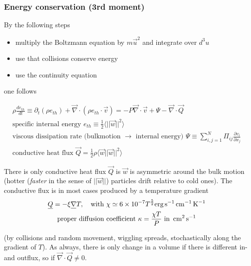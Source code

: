 \subsubsection{Energy conservation (3rd moment)}
By the following steps
\begin{itemize}
    \item multiply the Boltzmann equation by $m\vec{u}^2$ and integrate over $d^3u$
    \item use that collisions conserve energy
    \item use the continuity equation
\end{itemize}
one follows
\begin{mdframed}[style = padded]
    \begin{equation}
        \begin{gathered}
            \rho \frac{de_{th}}{dt} \equiv \partial_t (\rho e_{th}) + \vec{\nabla} \cdot (\rho e_{th}\cdot \vec{v}) = -P \vec{\nabla}\cdot \vec{v} + \Psi - \vec{\nabla} \cdot \vec{Q} \\
            \text{specific internal energy } e_{th} \equiv \frac{1}{2} \langle ||\vec{w}||^2 \rangle \\
            \text{viscous dissipation rate (bulkmotion } \rightarrow \text{ internal energy) } \Psi \equiv \sum_{i,j=1}^{N} \Pi_{ij} \frac{\partial v_i}{\partial x_j} \\
            \text{conductive heat flux } \vec{Q} = \frac{1}{2} \rho \langle \vec{w} ||\vec{w}||^2 \rangle
        \end{gathered}
    \end{equation}
\end{mdframed}
There is only conductive heat flux $\vec{Q}$ is $\vec{w}$ is asymmetric around the bulk motion (hotter (\textit{faster} in the sense of $||\vec{w}||$) particles drift relative to cold ones).
The conductive flux is in most cases produced by a temperature gradient
\begin{equation}
    \begin{gathered}
        \vec{Q} = -\xi \vec{\nabla} T, \quad \text{with } \chi \simeq 6 \times 10^{-7} T^{\frac{5}{2}} \text{erg} \s^{-1} \cm^{-1} \K^{-1} \\
        \text{proper diffusion coefficient } \kappa = \frac{\chi T}{P} \text{ in } \cm^2 \s^{-1}
    \end{gathered}
\end{equation}

(by collisions and random movement, wiggling spreads, stochastically along the gradient of $T$). As always, there is only change in a volume
if there is different in- and outflux, so if $\vec{\nabla} \cdot \vec{Q} \ne 0$.


